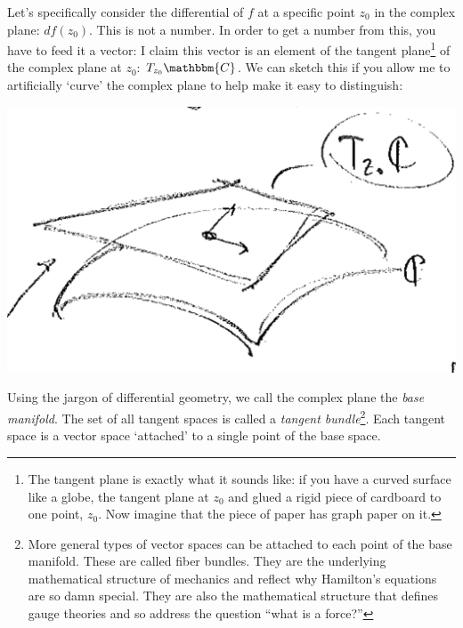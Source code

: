 Let's specifically consider the differential of $f$ at a specific point $z_0$ in the complex plane: $df(z_0)$. This is not a number. In order to get a number from this, you have to feed it a vector: I claim this vector is an element of the tangent plane\footnote{The tangent plane is exactly what it sounds like: if you have a curved surface like a globe, the tangent plane at $z_0$ and glued a rigid piece of cardboard to one point, $z_0$. Now imagine that the piece of paper has graph paper on it.} of the complex plane at $z_0$: $T_{z_0}\mathbbm{C}$. We can sketch this if you allow me to artificially `curve' the complex plane to help make it easy to distinguish:
\begin{center}
\includegraphics[width=.5\textwidth]{figures/lec13_mani.png}
\end{center}
Using the jargon of differential geometry, we call the complex plane the \emph{base manifold}. The set of all tangent spaces is called a \emph{tangent bundle}\footnote{More general types of vector spaces can be attached to each point of the base manifold. These are called fiber bundles. They are the underlying mathematical structure of mechanics and reflect why Hamilton's equations are so damn special. They are also the mathematical structure that defines gauge theories and so address the question ``what is a force?''}. Each tangent space is a vector space `attached' to a single point of the base space. 

